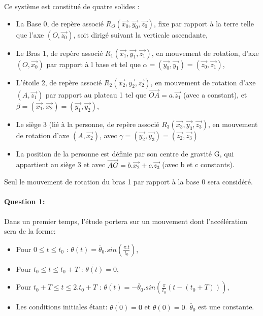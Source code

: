 Ce système est constitué de quatre solides :
\begin{itemize}
 \item  La Base 0, de repère associé $R_O(\overrightarrow{x_0},\overrightarrow{y_0},\overrightarrow{z_0})$, fixe par rapport à la terre telle que l'axe $(O, \overrightarrow{z_0})$, soit dirigé suivant la verticale ascendante,
 \item Le Bras 1, de repère associé $R_1(\overrightarrow{x_1},\overrightarrow{y_1},\overrightarrow{z_1})$, en mouvement de rotation, d'axe $(O, \overrightarrow{x_0})$ par rapport à l base et tel que $\alpha=(\overrightarrow{y_0},\overrightarrow{y_1})=(\overrightarrow{z_0},\overrightarrow{z_1})$,
 \item L'étoile 2, de repère associé $R_2(\overrightarrow{x_2},\overrightarrow{y_2},\overrightarrow{z_2})$, en mouvement de rotation d'axe $(A, \overrightarrow{z_1})$ par rapport au plateau 1 tel que $\overrightarrow{OA}=a.\overrightarrow{z_1}$ (avec a constant), et $\beta=(\overrightarrow{x_1},\overrightarrow{x_2})=(\overrightarrow{y_1},\overrightarrow{y_2})$,
 \item Le siège 3 (lié à la personne, de repère associé $R_3(\overrightarrow{x_3},\overrightarrow{y_3},\overrightarrow{z_3})$, en mouvement de rotation d'axe $(A, \overrightarrow{x_2})$, avec $\gamma=(\overrightarrow{y_2},\overrightarrow{y_3})=(\overrightarrow{z_2},\overrightarrow{z_3})$
 \item La position de la personne est définie par son centre de gravité G, qui appartient au siège 3 et avec $\overrightarrow{AG}=b.\overrightarrow{x_2}+c.\overrightarrow{z_3}$ (avec b et c constants).
\end{itemize}

Seul le mouvement de rotation du bras 1 par rapport à la base 0 sera considéré.

\paragraph{Question 1:} Dans un premier temps, l'étude portera sur un mouvement dont l'accélération sera de la forme:

\begin{itemize}
 \item Pour $0 \le t \le t_0$ : $\ddot{\theta(t)}=\ddot{\theta_0}.sin(\frac{\pi.t}{t_0})$,
 \item Pour $t_0 \le t \le t_0+T$ : $\ddot{\theta(t)}=0$,
 \item Pour $t_0+T \le t \le 2.t_0+T$ : $\ddot{\theta(t)}=-\ddot{\theta_0}.sin(\frac{\pi}{t_0}(t-(t_0+T)))$,
 \item Les conditions initiales étant: $\dot{\theta(0)}=0$ et $\theta(0)=0$. $\ddot{\theta_0}$ est une constante.
\end{itemize}

